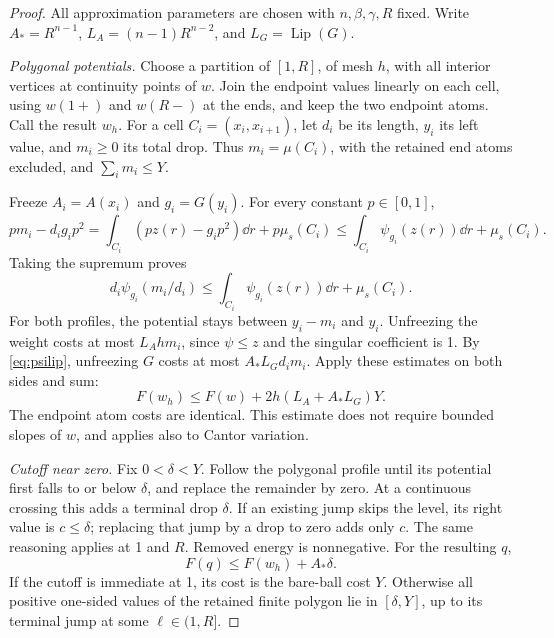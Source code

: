 \begin{proof}
All approximation parameters are chosen with \(n,\beta,\gamma,R\)
fixed. Write \(A_*=R^{n-1}\), \(L_A=(n-1)R^{n-2}\), and
\(L_G=\operatorname{Lip}(G)\).

\emph{Polygonal potentials.}
Choose a partition of \([1,R]\), of mesh \(h\), with all interior
vertices at continuity points of \(w\). Join the endpoint values
linearly on each cell, using \(w(1+)\) and \(w(R-)\) at the ends,
and keep the two endpoint atoms. Call the result \(w_h\).
For a cell \(C_i=(x_i,x_{i+1})\), let \(d_i\) be its length,
\(y_i\) its left value, and \(m_i\ge0\) its total drop. Thus
\(m_i=\mu(C_i)\), with the retained end atoms excluded, and
\(\sum_i m_i\le Y\).

Freeze \(A_i=A(x_i)\) and \(g_i=G(y_i)\).
For every constant \(p\in[0,1]\),
\[
 pm_i-d_ig_ip^2
   =\int_{C_i}(pz(r)-g_ip^2)\dd r+p\mu_s(C_i)
   \le\int_{C_i}\psi_{g_i}(z(r))\dd r+\mu_s(C_i).
\]
Taking the supremum proves
\[
 d_i\psi_{g_i}(m_i/d_i)
       \le\int_{C_i}\psi_{g_i}(z(r))\dd r+\mu_s(C_i).
\]
For both profiles, the potential stays between \(y_i-m_i\) and \(y_i\).
Unfreezing the weight costs at most \(L_Ahm_i\), since
\(\psi\le z\) and the singular coefficient is 1.
By \eqref{eq:psilip}, unfreezing \(G\) costs at most
\(A_*L_Gd_im_i\). Apply these estimates on both sides and sum:
\begin{equation}\label{eq:polygonalerror}
 F(w_h)\le F(w)+2h(L_A+A_*L_G)Y .
\end{equation}
The endpoint atom costs are identical. This estimate does not require
bounded slopes of \(w\), and applies also to Cantor variation.

\emph{Cutoff near zero.}
Fix \(0<\delta<Y\). Follow the polygonal profile until its potential
first falls to or below \(\delta\), and replace the remainder by zero.
At a continuous crossing this adds a terminal drop \(\delta\).
If an existing jump skips the level, its right value is
\(c\le\delta\); replacing that jump by a drop to zero adds only \(c\).
The same reasoning applies at 1 and \(R\). Removed energy is nonnegative.
For the resulting \(q\),
\begin{equation}\label{eq:cutofferror}
 F(q)\le F(w_h)+A_*\delta.
\end{equation}
If the cutoff is immediate at 1, its cost is the bare-ball cost \(Y\).
Otherwise all positive one-sided values of the retained finite polygon
lie in \([\delta,Y]\), up to its terminal jump at some
\(\ell\in(1,R]\).


\end{proof}
